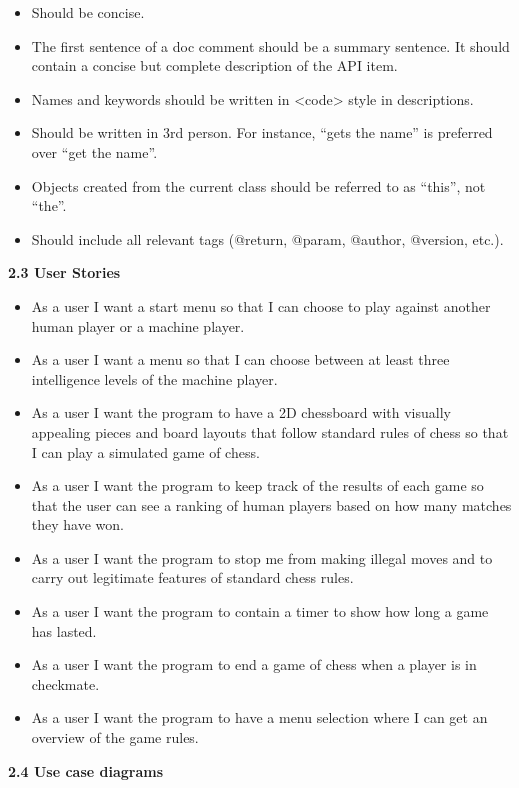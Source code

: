 \documentclass{article}
\begin{document}
\begin{flushleft}
\begin{itemize}
\begin{itemize}
		\item Should be concise.
		\item The first sentence of a doc comment should be a summary sentence. It should contain a concise but complete description of the API item.
		\item Names and keywords should be written in <code> style in descriptions.
		\item Should be written in 3rd person. For instance, “gets the name” is preferred over “get the name”.
		\item Objects created from the current class should be referred to as “this”, not “the”.
		\item Should include all relevant tags (@return, @param, @author, @version, etc.).
	\end{itemize}
\end{itemize}

\vspace{5mm}
\textbf{2.3	User Stories}\\
	\begin{itemize}
	
	\item As a user I want a start menu so that I can choose to play against another human player or a machine player.
	\item As a user I want a menu so that I can choose between at least three intelligence levels of the machine player.
	\item As a user I want the program to have a 2D chessboard with visually appealing pieces and board layouts that follow standard rules of chess so that I can play a simulated game of chess.
	\item As a user I want the program to keep track of the results of each game so that the user can see a ranking of human players based on how many matches they have won.

	\item As a user I want the program to stop me from making illegal moves and to carry out legitimate features of standard chess rules.
	\item As a user I want the program to contain a timer to show how long a game has lasted.
	\item As a user I want the program to end a game of chess when a player is in checkmate.
	\item As a user I want the program to have a menu selection where I can get an overview of the game rules.
	\end{itemize}
\vspace{5mm}

\newpage

\textbf{2.4	Use case diagrams}\\

\end{flushleft}
\end{document}
